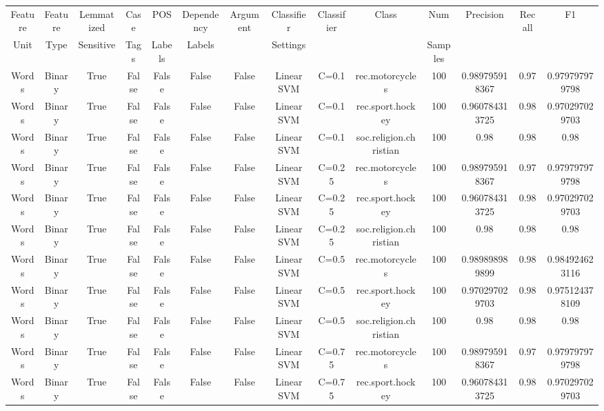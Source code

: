\documentclass[11pt]{article}
\newcommand{\headcol}{\rowcolor{tableheadcolor}} %
\begin{document}
  \begin{tabular}{|c|c|c|c|c|c|c|c|c|c|c|c|c|c|}
  \hline
\headcol \color{white}   Feature  & \color{white}  Feature  &  \color{white} Lemmatized & \color{white} Case  & \color{white}   POS  & \color{white}   Dependency  &  \color{white}  Argument  & \color{white}  Classifier & \color{white}  Classifier  & \color{white}  Class & \color{white} Num &\color{white}  Precision & \color{white}  Recall & \color{white}  F1 \\
 \headcol \color{white} Unit & \color{white} Type & \color{white} Sensitive & \color{white} Tags & \color{white}  Labels &  \color{white} Labels & &  \color{white} Settings & &  & \color{white} Samples & & &  \\
  \hline
  Words & Binary & True & False & False & False & False & Linear SVM & C=0.1 & rec.motorcycles & 100 & 0.989795918367 & 0.97 & 0.979797979798 \\ 
Words & Binary & True & False & False & False & False & Linear SVM & C=0.1 & rec.sport.hockey & 100 & 0.960784313725 & 0.98 & 0.970297029703 \\ 
Words & Binary & True & False & False & False & False & Linear SVM & C=0.1 & soc.religion.christian & 100 & 0.98 & 0.98 & 0.98 \\ 
Words & Binary & True & False & False & False & False & Linear SVM & C=0.25 & rec.motorcycles & 100 & 0.989795918367 & 0.97 & 0.979797979798 \\ 
Words & Binary & True & False & False & False & False & Linear SVM & C=0.25 & rec.sport.hockey & 100 & 0.960784313725 & 0.98 & 0.970297029703 \\ 
Words & Binary & True & False & False & False & False & Linear SVM & C=0.25 & soc.religion.christian & 100 & 0.98 & 0.98 & 0.98 \\ 
Words & Binary & True & False & False & False & False & Linear SVM & C=0.5 & rec.motorcycles & 100 & 0.989898989899 & 0.98 & 0.984924623116 \\ 
Words & Binary & True & False & False & False & False & Linear SVM & C=0.5 & rec.sport.hockey & 100 & 0.970297029703 & 0.98 & 0.975124378109 \\ 
Words & Binary & True & False & False & False & False & Linear SVM & C=0.5 & soc.religion.christian & 100 & 0.98 & 0.98 & 0.98 \\ 
Words & Binary & True & False & False & False & False & Linear SVM & C=0.75 & rec.motorcycles & 100 & 0.989795918367 & 0.97 & 0.979797979798 \\ 
Words & Binary & True & False & False & False & False & Linear SVM & C=0.75 & rec.sport.hockey & 100 & 0.960784313725 & 0.98 & 0.970297029703 \\ 

\end{tabular}
\end{document}

